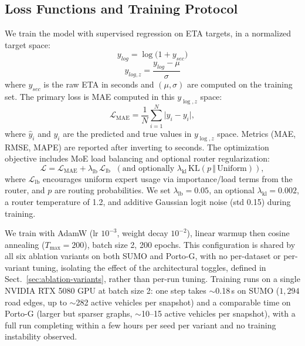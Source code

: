 \subsection{Loss Functions and Training Protocol}\label{sec:loss}
We train the model with supervised regression on ETA targets, in a normalized target space:
\begin{equation}
y_{log} = \log\big(1 + y_{sec}\big)
\end{equation}
\begin{equation}
y_{log,z} = \frac{y_{log} - \mu}{\sigma}
\end{equation}
where $y_{sec}$ is the raw ETA in seconds and $(\mu,\sigma)$ are computed on the training set. The primary loss is MAE computed in this $y_{\log,z}$ space:
\begin{equation}
\mathcal{L}_{\text{MAE}} = \frac{1}{N}\sum_{i=1}^N \big| \hat{y}_i - y_i \big|,
\end{equation}
where $\hat{y}_i$ and $y_i$ are the predicted and true values in $y_{\log,z}$ space. Metrics (MAE, RMSE, MAPE) are reported after inverting to seconds. The optimization objective includes MoE load balancing and optional router regularization:
\begin{equation}
\mathcal{L} = \mathcal{L}_{\text{MAE}} + \lambda_{\text{lb}}\,\mathcal{L}_{\text{lb}} \;\; (\text{and optionally }
\lambda_{\text{kl}}\,\mathrm{KL}(p\,\Vert\,\text{Uniform})),
\end{equation}
where $\mathcal{L}_{\text{lb}}$ encourages uniform expert usage via importance/load terms from the router, and $p$ are routing probabilities. We set $\lambda_{\text{lb}}{=}0.05$, an optional $\lambda_{\text{kl}}{=}0.002$, a router temperature of 1.2, and additive Gaussian logit noise (std 0.15) during training.

We train with AdamW (lr $10^{-3}$, weight decay $10^{-2}$), linear warmup then cosine annealing ($T_{\text{max}}{=}200$), batch size 2, 200 epochs. This configuration is shared by all six ablation variants on both SUMO and Porto-G, with no per-dataset or per-variant tuning, isolating the effect of the architectural toggles, defined in Sect.~\ref{sec:ablation-variants}, rather than per-run tuning. Training runs on a single NVIDIA RTX 5080 GPU at batch size 2: one step takes $\sim$0.18\,s on SUMO ($1{,}294$ road edges, up to $\sim$282 active vehicles per snapshot) and a comparable time on Porto-G (larger but sparser graphs, $\sim$10--15 active vehicles per snapshot), with a full run completing within a few hours per seed per variant and no training instability observed.

